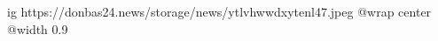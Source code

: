  
 
 
 
 

\ifcmt
  ig https://donbas24.news/storage/news/ytlvhwwdxytenl47.jpeg
  @wrap center
  @width 0.9
\fi
